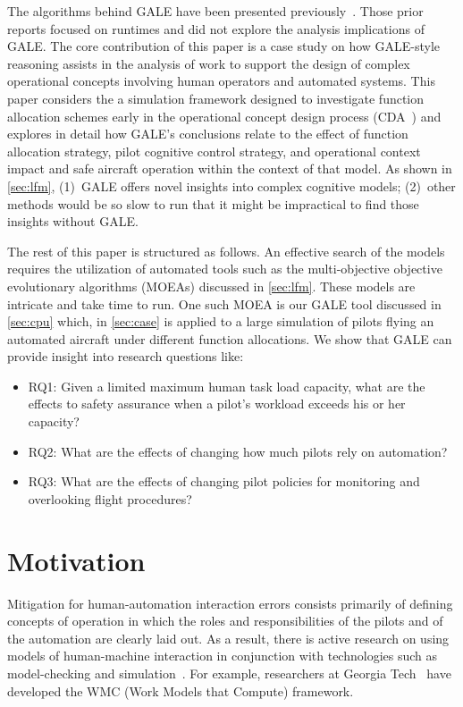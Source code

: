 \documentclass[journal]{IEEEtran}
\newcommand{\tion}[1]{\textsection\ref{sec:#1}}
\begin{document}
The algorithms behind GALE have been presented previously~\cite{krall14aaai,krallphd,galepaper}.
 Those prior reports  focused on runtimes and did not explore the analysis implications of GALE.
The core contribution of this paper is a case study on how GALE-style reasoning assists 
in the analysis of
work to support the design of complex operational concepts involving human operators and automated systems. This paper considers the a simulation framework designed to investigate function allocation schemes early in the operational concept design process (CDA~\cite{Kim2011,Pritchett2011,Feigh2012,Kim2013,Pritchett2013}) 
and explores in detail how GALE’s conclusions relate to the effect of function allocation strategy, pilot cognitive control strategy, and operational context impact and safe aircraft operation within the context of that model. 
As shown in \tion{lfm}, (1)~GALE offers  novel insights into complex cognitive models; (2)~other methods would be so slow to run that it might be impractical to find those insights without GALE.


The rest of this  paper is structured as follows.
An effective search of the models requires the utilization of automated tools such as the multi-objective objective evolutionary algorithms (MOEAs) discussed in \tion{lfm}.
These models are intricate and take time to run. 
One such MOEA is our GALE tool discussed in \tion{cpu} which, in \tion{case} is applied to a large simulation
of pilots flying an automated aircraft under different function allocations.
We show that GALE can provide insight into research questions like:
\begin{itemize}
\item RQ1:  Given a limited maximum human task load capacity, what are the effects to safety assurance when a pilot's workload exceeds his or her capacity?
\item RQ2:  What are the effects of changing how much pilots rely on automation?
\item RQ3: What are the effects of changing pilot policies for monitoring and overlooking flight procedures? 
\end{itemize}






\section{Motivation}\label{sec:mot}


Mitigation for human-automation interaction errors consists primarily of defining concepts of operation in which the roles and responsibilities of the pilots and of the automation are clearly laid out.
As a result, there is active research on using models of human-machine interaction in conjunction with technologies such as model-checking 
and simulation~\cite{Bolton2011,Rungta2013,Gelman2014}. 
For example, researchers at Georgia Tech~\cite{Kim2011,Pritchett2011,Feigh2012,Kim2013,Pritchett2014,Feigh2014} have developed the WMC (Work Models that Compute) framework.  
\end{document}

